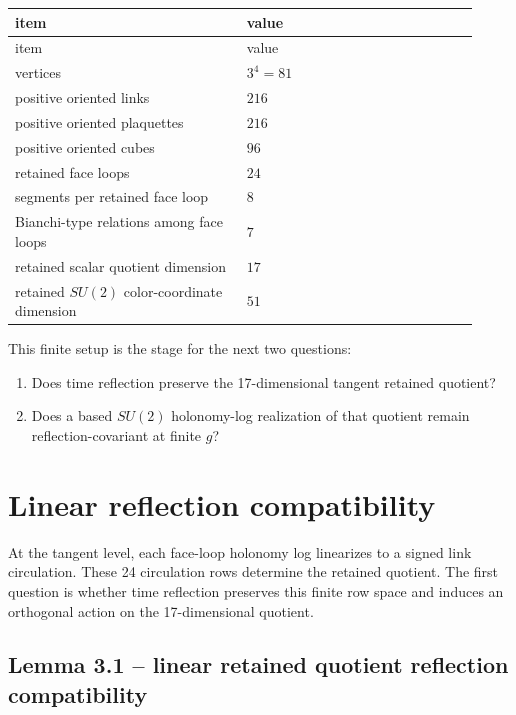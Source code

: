 \documentclass[10pt]{article}
\begin{document}
\begin{center}
\small
\begin{longtable}{|p{0.46\linewidth}|p{0.46\linewidth}|}
\hline
item & value \\
\hline
\endfirsthead
\hline
item & value \\
\hline
\endhead
vertices & \(3^4=81\) \\
\hline
positive oriented links & \(216\) \\
\hline
positive oriented plaquettes & \(216\) \\
\hline
positive oriented cubes & \(96\) \\
\hline
retained face loops & \(24\) \\
\hline
segments per retained face loop & \(8\) \\
\hline
Bianchi-type relations among face loops & \(7\) \\
\hline
retained scalar quotient dimension & \(17\) \\
\hline
retained \(SU(2)\) color-coordinate dimension & \(51\) \\
\hline
\end{longtable}
\end{center}

This finite setup is the stage for the next two questions:

\begin{enumerate}[leftmargin=*]
\item Does time reflection preserve the 17-dimensional tangent retained quotient?
\item Does a based \(SU(2)\) holonomy-log realization of that quotient remain reflection-covariant at finite \(g\)?
\end{enumerate}

\section{Linear reflection compatibility}

At the tangent level, each face-loop holonomy log linearizes to a signed link circulation.  These 24 circulation rows determine the retained quotient.  The first question is whether time reflection preserves this finite row space and induces an orthogonal action on the 17-dimensional quotient.

\subsection{Lemma 3.1 -- linear retained quotient reflection compatibility}
\end{document}
